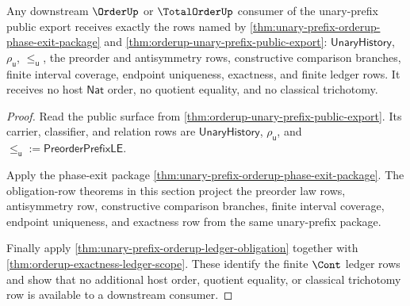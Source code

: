 \begin{theorem}
\label{thm:totalorder-orderup-consumer-coverage-boundary}
Any downstream $\OrderUp$ or $\TotalOrderUp$ consumer of the unary-prefix public
export receives exactly the rows named by
\autoref{thm:unary-prefix-orderup-phase-exit-package} and
\autoref{thm:orderup-unary-prefix-public-export}: $\mathsf{UnaryHistory}$,
$\rho_{\mathsf{u}}$, $\le_{\mathsf{u}}$, the preorder and antisymmetry rows,
constructive comparison branches, finite interval coverage, endpoint uniqueness,
exactness, and finite ledger rows. It receives no host $\mathsf{Nat}$ order, no
quotient equality, and no classical trichotomy.
\end{theorem}
\begin{proof}
Read the public surface from
\autoref{thm:orderup-unary-prefix-public-export}. Its carrier, classifier, and
relation rows are $\mathsf{UnaryHistory}$, $\rho_{\mathsf{u}}$, and
$\le_{\mathsf{u}} := \mathsf{PreorderPrefixLE}$.

Apply the phase-exit package
\autoref{thm:unary-prefix-orderup-phase-exit-package}. The obligation-row
theorems in this section project the preorder law rows, antisymmetry row,
constructive comparison branches, finite interval coverage, endpoint uniqueness,
and exactness row from the same unary-prefix package.

Finally apply \autoref{thm:unary-prefix-orderup-ledger-obligation} together with
\autoref{thm:orderup-exactness-ledger-scope}. These identify the finite
$\Cont$ ledger rows and show that no additional host order, quotient equality,
or classical trichotomy row is available to a downstream consumer.
\end{proof}

